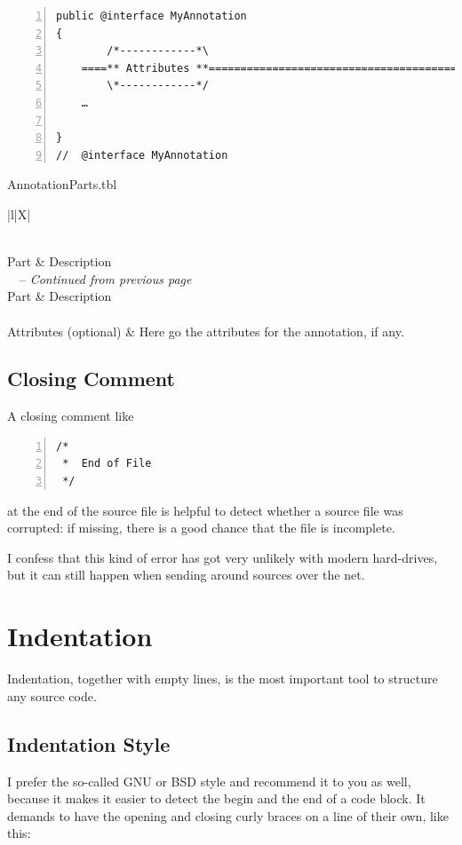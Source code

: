 \documentclass[12pt,a4paper,titlepage, parskip=half, headsepline, footsepline, cleardoubleplain]{scrbook}
\begin{document}
\begin{lstlisting}[numbers=left,caption={Annotation Skeleton}]
public @interface MyAnnotation 
{
        /*------------*\
    ====** Attributes **=============================================
        \*------------*/
    …
                
}
//  @interface MyAnnotation
\end{lstlisting}
 
\begin{filecontents}{AnnotationParts.tbl}
  \begin{longtable}{|l|X|}
  \caption{Parts of an annotation declaration} \\
  \hline 
  Part & Description \\ 
  \hline
  \endfirsthead
  {\tablename\ \thetable\ -- \textit{Continued from previous page}} \\
  \hline 
  Part & Description \\ 
  \hline
  \endhead
   \\ 
  \endfoot
  \endlastfoot
  Attributes (optional) & Here go the attributes for the annotation, if any. \\ 
  \hline 
 \end{longtable} 
\end{filecontents}

\subsection{Closing Comment}
A closing comment like
\begin{lstlisting}[numbers=left, caption={Closing Comment}]
/*
 *  End of File
 */
\end{lstlisting}
at the end of the source file is helpful to detect whether a source file was corrupted: if missing, there is a good chance that the file is incomplete.

I confess that this kind of error has got very unlikely with modern hard-drives, but it can still happen when sending around sources over the net.

\section{Indentation}
Indentation, together with empty lines, is the most important tool to structure any source code.

\subsection{Indentation Style}\label{sec:IndentationStyle}
I prefer the so-called GNU or BSD style and recommend it to you as well, because it makes it easier to detect the begin and the end of a code block. It demands to have the opening and closing curly braces on a line of their own, like this:
\end{document}
